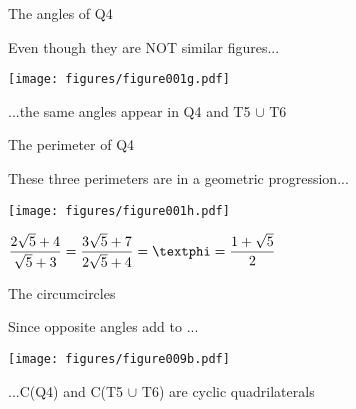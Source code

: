 \documentclass[14pt]{beamer}
\begin{document}

    \begin{frame}{The angles of Q4}
        \begin{center}
            Even though they are NOT similar figures...
        \end{center}
        \hspace{6.18em} \texttt{[image: figures/figure001g.pdf]} \\
        \begin{center}
            ...the same angles appear in Q4 and T5 $\cup$ T6
        \end{center}
    \end{frame}


    \begin{frame}{The perimeter of Q4}
        \begin{center}
            These three perimeters are in a geometric progression...
        \end{center}
        \hspace{6.18em} \texttt{[image: figures/figure001h.pdf]} \\
        \begin{center}
            \vspace{-1.3ex}%
            $\displaystyle\frac{2\sqrt{5} + 4}{\sqrt{5} + 3} = \frac{3\sqrt{5} + 7}{2\sqrt{5} + 4} = \text{\textphi} = \frac{1+\sqrt{5}}{2}$
            \vspace{-1.3ex}
        \end{center}
    \end{frame}


    \begin{frame}{The circumcircles}
        \begin{center}
            Since opposite angles add to \textpi...
        \end{center}
        \vspace{0.4em}
        \hspace{5.25em} \texttt{[image: figures/figure009b.pdf]} \\
        \begin{center}
            ...C(Q4) and C(T5 $\cup$ T6) are cyclic quadrilaterals
        \end{center}
    \end{frame}
\end{document}

